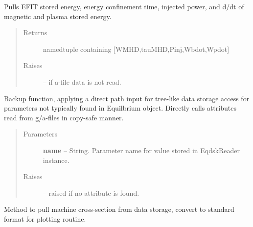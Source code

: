 \documentclass[letterpaper,10pt,english]{sphinxmanual}
\begin{document}
\begin{fulllineitems}
\begin{fulllineitems}
\end{fulllineitems}


\begin{fulllineitems}
\label{eqtools:eqtools.eqdskreader.EqdskReader.getEnergy}
Pulls EFIT stored energy, energy confinement time, injected power, and d/dt of magnetic and plasma stored energy.
\begin{quote}\begin{description}
\item[{Returns}] \leavevmode
namedtuple containing {[}WMHD,tauMHD,Pinj,Wbdot,Wpdot{]}

\item[{Raises}] \leavevmode
{} -- 
if a-file data is not read.

\end{description}\end{quote}

\end{fulllineitems}


\begin{fulllineitems}
\label{eqtools:eqtools.eqdskreader.EqdskReader.getParam}
Backup function, applying a direct path input for tree-like data storage access
for parameters not typically found in Equilbrium object.  Directly calls attributes
read from g/a-files in copy-safe manner.
\begin{quote}\begin{description}
\item[{Parameters}] \leavevmode
\textbf{name} --
String.
Parameter name for value stored in EqdskReader instance.

\item[{Raises}] \leavevmode
{} -- 
raised if no attribute is found.

\end{description}\end{quote}

\end{fulllineitems}


\begin{fulllineitems}
\label{eqtools:eqtools.eqdskreader.EqdskReader.getMachineCrossSection}
Method to pull machine cross-section from data storage, convert to standard format for plotting routine.


\end{fulllineitems}
\end{fulllineitems}
\end{document}
